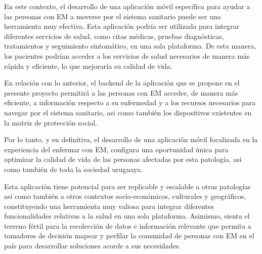 En este contexto, el desarrollo de una aplicación móvil específica para ayudar a las personas con EM a moverse por el sistema sanitario puede ser una herramienta muy efectiva. Esta aplicación podría ser utilizada para integrar diferentes servicios de salud, como citas médicas, pruebas diagnósticas, tratamientos y seguimiento sintomático, en una sola plataforma. De esta manera, los pacientes podrían acceder a los servicios de salud necesarios de manera más rápida y eficiente, lo que mejoraría su calidad de vida.

En relación con lo anterior, el backend de la aplicación que se propone en el presente proyecto permitirá a las personas con EM acceder, de manera más eficiente, a información respecto a su enfermedad y a los recursos necesarios para navegar por el sistema sanitario, asi como también los dispositivos existentes en la matriz de protección social.

Por lo tanto, y en definitiva, el desarrollo de una aplicación móvil focalizada en la experiencia del enfermar con EM, configura una oportunidad única para optimizar la calidad de vida de las personas afectadas por esta patología, asi como también de toda la sociedad uruguaya.

Esta aplicación tiene potencial para ser replicable y escalable a otras patologías así como también a otros contextos socio-económicos, culturales y geográficos, constituyendo una herramienta muy valiosa para integrar diferentes funcionalidades relativas a la salud en una sola plataforma. Asimismo, sienta el terreno fértil para la recolección de datos e información relevante que permita a tomadores de decisión mapear y perfilar la comunidad de personas con EM en el país para desarrollar soluciones acorde a sus necesidades.


